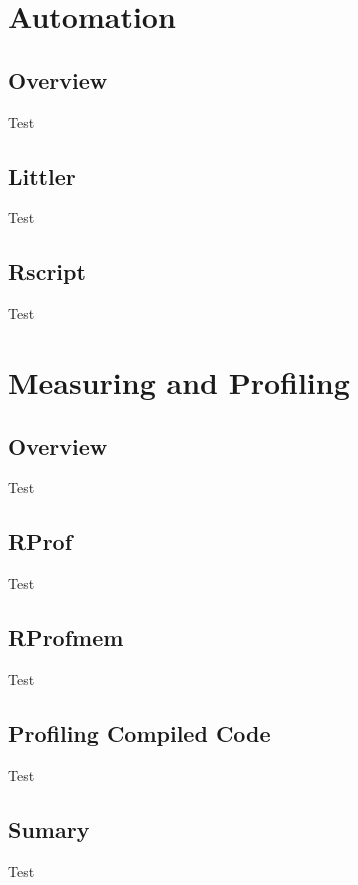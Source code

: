 \documentclass[compress]{beamer}
\begin{document}
\section[Tools]{Automation}
\subsection{Overview}
\begin{frame}Test\end{frame}
\subsection{Littler}
\begin{frame}Test\end{frame}
\subsection{Rscript}
\begin{frame}Test\end{frame}

\section[Measure]{Measuring and Profiling}
\subsection{Overview}
\begin{frame}Test\end{frame}
\subsection{RProf}
\begin{frame}Test\end{frame}
\subsection{RProfmem}
\begin{frame}Test\end{frame}
\subsection[Profiling]{Profiling Compiled Code}
\begin{frame}Test\end{frame}
\subsection{Sumary}
\begin{frame}Test\end{frame}
\end{document}
